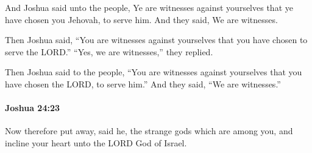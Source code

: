			\begin{versebox}
					\item[BHS] 
					\item[ASV] And Joshua said unto the people, Ye are witnesses against yourselves that ye have chosen you Jehovah, to serve him. And they said, We are witnesses.
					\item[NIV] Then Joshua said, “You are witnesses against yourselves that you have chosen to serve the LORD.” “Yes, we are witnesses,” they replied.
					\item[NRSV] Then Joshua said to the people, “You are witnesses against yourselves that you have chosen the LORD, to serve him.” And they said, “We are witnesses.”
			\end{versebox}

		\paragraph{Joshua 24:23} %
			\label{JOSHUA-24-23}

			Now therefore put away, said he, the strange gods which are among you, and incline your heart unto the LORD God of Israel.


